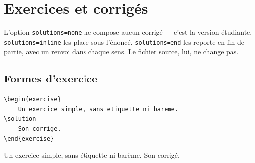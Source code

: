 %

\lstset{language=[LaTeX]TeX}

\chapter{Exercices et corrigés}%
\label{chap:exercises}
\minitoc%

\begin{chapterintro}
    L'option \texttt{solutions=none} ne compose aucun corrigé --- c'est la
    version étudiante. \texttt{solutions=inline} les place sous l'énoncé.
    \texttt{solutions=end} les reporte en fin de partie, avec un renvoi dans
    chaque sens. Le fichier source, lui, ne change pas.
\end{chapterintro}

\section{Formes d'exercice}%
\label{sec:exforms}

\begin{lstlisting}
\begin{exercise}
    Un exercice simple, sans etiquette ni bareme.
\solution
    Son corrige.
\end{exercise}
\end{lstlisting}
\begin{exercise}
    Un exercice simple, sans étiquette ni barème.
\solution
    Son corrigé.
\end{exercise}

